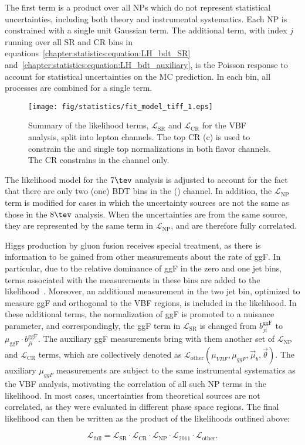 \noindent
The first term is a product over all NPs which do not represent
statistical uncertainties, including both theory and instrumental
systematics. Each NP is constrained with a single unit Gaussian
term. The additional term, with index $j$ running over all SR and CR bins in
equations~\ref{chapter:statistics:equation:LH_bdt_SR}
and~\ref{chapter:statistics:equation:LH_bdt_auxiliary}, is the Poisson
response to account for statistical uncertainties on the MC
prediction. In each bin, all processes are combined for a single
term. 

\begin{figure}[h]
  \centering
  \texttt{[image: fig/statistics/fit\_model\_tiff\_1.eps]}
   \caption{Summary of the likelihood terms,
  $\mathscr{L}_{\textrm{SR}}$ and $\mathscr{L}_{\textrm{CR}}$ for the VBF
  analysis, split into lepton channels. The top CR (c) is used to
  constrain the \ttbar and single top normalizations in both flavor
  channels. The \ZDY CR constrains \ZDYll in the \eemm channel only.}
  \label{chap:analysis:fig:fit_model}
\end{figure}

The likelihood model for the $7 \tev$ analysis is adjusted to account for
the fact that there are only two (one) BDT bins in the \emme (\eemm)
channel. In addition, the $\mathscr{L}_{\textrm{NP}}$ term is modified
for cases in which the uncertainty sources are not the same as those
in the $8 \tev$ analysis. When the uncertainties are from the same
source, they are represented by the same term in
$\mathscr{L}_{\textrm{NP}}$, and are therefore fully correlated. 

Higgs production by gluon fusion receives special treatment, as there
is information to be gained from other \hwwlnln
measurements about the rate of ggF. In particular, due to the relative dominance of ggF in
the zero and one jet bins, terms associated with the measurements in
these bins are added to the likelihood~\cite{}. Moreover, an additional
measurement in the two jet bin, optimized to measure ggF and orthogonal
to the VBF regions, is included in the likelihood. In these
additional terms, the normalization of ggF is promoted to a nuisance
parameter, and correspondingly, the ggF term in
$\mathscr{L}_{\textrm{SR}}$ is changed from $b^{\textrm{ggF}}_{ji}$ to
$\mu_{\textrm{ggF}}\cdot b^{\textrm{ggF}}_{ji}$. The auxiliary ggF
measurements bring with them another set of
$\mathscr{L}_{\textrm{NP}}$ and $\mathscr{L}_{\textrm{CR}}$ terms,
which are collectively denoted as
$\mathscr{L}_{\textrm{other}}(\mu_{VBF},\mu_{ggF},\vec{\mu}_b,\vec{\theta})$. The
auxiliary $\mu_{ggF}$ measurements are subject to the same
instrumental systematics as the VBF analysis, motivating the
correlation of all such NP terms in the likelihood. In most cases,
uncertainties from theoretical sources are not correlated, as they
were evaluated in different phase space regions. The final likelihood
can then be written as the product of the likelihoods outlined above:

\begin{equation}
\mathscr{L}_{\textrm{full}} = \mathscr{L}_{\textrm{SR}}\cdot\mathscr{L}_{\textrm{CR}}\cdot\mathscr{L}_{\textrm{NP}}\cdot\mathscr{L}_{\textrm{2011}}\cdot\mathscr{L}_{\textrm{other}}.
\end{equation}

